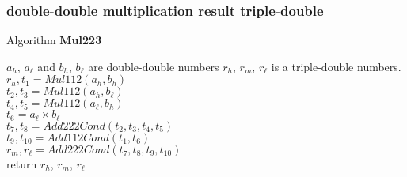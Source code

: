 \subsubsection{double-double multiplication result triple-double}

\begin{algorithm}[htbp]
  \caption{Algorithm \textbf{Mul223}}
\begin{algorithmic}[1]
\Input $a_h$, $a_{\ell}$ and $b_h$, $b_{\ell}$ are  double-double numbers
\Output $r_h$, $r_m$, $r_{\ell}$ is a triple-double numbers.
\State $r_h,t_1 = Mul112(a_h,b_h)$\\
    $t_2,t_3 = Mul112(a_h,b_{\ell})$\\
    $t_4,t_5 = Mul112(a_{\ell},b_h)$\\
    $t_6 = a_{\ell}\times b_{\ell}$\\
    $t_7,t_8 = Add222Cond(t_2,t_3,t_4,t_5)$\\
    $t_9,t_{10} = Add112Cond(t_1,t_6)$\\
    $r_m,r_{\ell} = Add222Cond(t_7,t_8,t_9,t_{10})$\\
    return $r_h$, $r_m$, $r_{\ell}$
\end{algorithmic}
\end{algorithm}
